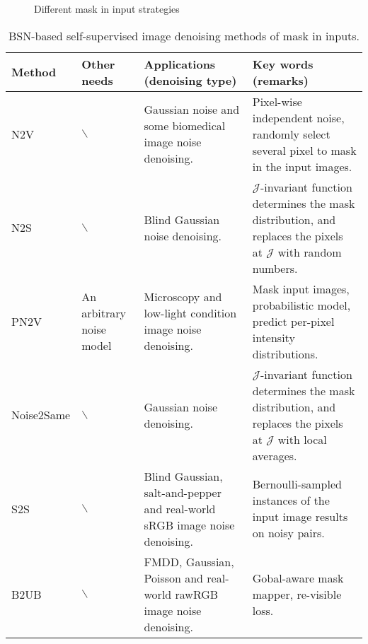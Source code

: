 \documentclass[conference]{IEEEtran}
\begin{document}
\begin{figure*}[htbp]
	\setlength{\abovecaptionskip}{0cm}
	\setlength{\belowcaptionskip}{0cm}
	\centering
     \begin{minipage}[b]{0.28\linewidth}
	\end{minipage}
	\begin{minipage}[b]{0.65\linewidth}
           \quad
	\end{minipage} %
	\caption{Different mask in input strategies}
	\label{fig:figure 2}
\vspace{-1em}
\end{figure*}

\begin{table*}[t]
	\setlength{\abovecaptionskip}{0cm}
	\caption{BSN-based self-supervised image denoising methods of mask in inputs.}
	\centering
	\begin{tabular}{|m{2.2cm}<{\raggedright}|m{2cm}<{\raggedright}|m{4cm}<{\raggedright}|m{7.5cm}<{\raggedright}|}
		\hline
		Method&	Other needs	&Applications (denoising type)	&Key words (remarks)\\
		\hline
		N2V\cite{krull2019noise2void}&	$\backslash$	&Gaussian noise and some biomedical image noise denoising.	&Pixel-wise independent noise, randomly select several pixel to mask in the input images.\\
		\hline
		N2S\cite{batson2019noise2self}&	$\backslash$	&Blind Gaussian noise denoising.&	 $\mathcal{J}$-invariant function determines the mask distribution, and replaces the pixels at  $\mathcal{J}$ with random numbers.\\
		\hline
		PN2V \cite{krull2020probabilistic}&	An arbitrary noise model&	Microscopy and low-light condition image noise denoising.&	Mask input images, probabilistic model, predict per-pixel intensity distributions.\\
		\hline
		Noise2Same \cite{xie2020noise2same}&	$\backslash$	&Gaussian noise denoising.	& $\mathcal{J}$-invariant function determines the mask distribution, and replaces the pixels at  $\mathcal{J}$ with local averages.\\
		\hline
		S2S \cite{quan2020self2self}&	$\backslash$	&Blind Gaussian, salt-and-pepper and real-world sRGB image noise denoising.&	Bernoulli-sampled instances of the input image results on noisy pairs.\\
		\hline
		B2UB\cite{wang2022blind2unblind}&	$\backslash$	&FMDD, Gaussian, Poisson and real-world rawRGB image noise denoising.&	Gobal-aware mask mapper, re-visible loss.\\
		\hline
	\end{tabular}
	\setlength{\belowcaptionskip}{-0.5cm}
	\label{tab:mask_in_input}
\vspace{-2em}
\end{table*}
\end{document}

